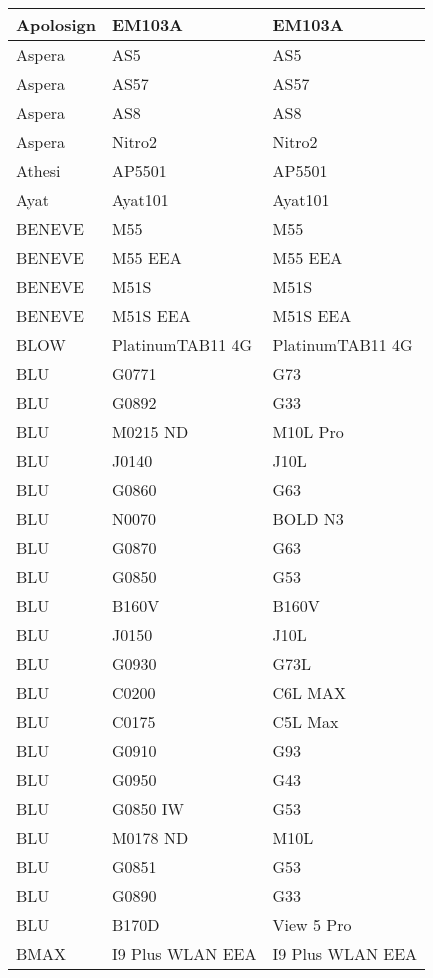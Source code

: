\begin{tabularx}{\linewidth}{|l|X|X|}
        Apolosign & EM103A & EM103A \\ \hline
        Aspera & AS5 & AS5 \\ \hline
        Aspera & AS57 & AS57 \\ \hline
        Aspera & AS8 & AS8 \\ \hline
        Aspera & Nitro2 & Nitro2 \\ \hline
        Athesi & AP5501 & AP5501 \\ \hline
        Ayat & Ayat101 & Ayat101 \\ \hline
        BENEVE & M55 & M55 \\ \hline
        BENEVE & M55 EEA & M55 EEA \\ \hline
        BENEVE & M51S & M51S \\ \hline
        BENEVE & M51S EEA & M51S EEA \\ \hline
        BLOW & PlatinumTAB11 4G & PlatinumTAB11 4G \\ \hline
        BLU & G0771 & G73 \\ \hline
        BLU & G0892 & G33 \\ \hline
        BLU & M0215 ND & M10L Pro \\ \hline
        BLU & J0140 & J10L \\ \hline
        BLU & G0860 & G63 \\ \hline
        BLU & N0070 & BOLD N3 \\ \hline
        BLU & G0870 & G63 \\ \hline
        BLU & G0850 & G53 \\ \hline
        BLU & B160V & B160V \\ \hline
        BLU & J0150 & J10L \\ \hline
        BLU & G0930 & G73L \\ \hline
        BLU & C0200 & C6L MAX \\ \hline
        BLU & C0175 & C5L Max \\ \hline
        BLU & G0910 & G93 \\ \hline
        BLU & G0950 & G43 \\ \hline
        BLU & G0850 IW & G53 \\ \hline
        BLU & M0178 ND & M10L \\ \hline
        BLU & G0851 & G53 \\ \hline
        BLU & G0890 & G33 \\ \hline
        BLU & B170D & View 5 Pro \\ \hline
        BMAX & I9 Plus WLAN EEA & I9 Plus WLAN EEA \\ \hline

\end{tabularx}
